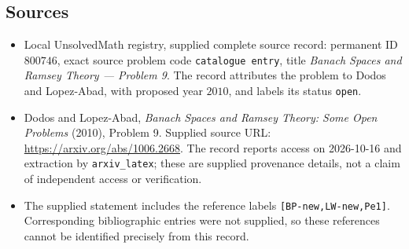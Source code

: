 \documentclass[11pt]{article}
\begin{document}
\subsection{Sources}
\begin{itemize}
\item Local UnsolvedMath registry, supplied complete source record: permanent ID \(800746\), exact source problem code \texttt{catalogue entry}, title \emph{Banach Spaces and Ramsey Theory --- Problem 9}. The record attributes the problem to Dodos and Lopez-Abad, with proposed year \(2010\), and labels its status \texttt{open}.
\item Dodos and Lopez-Abad, \emph{Banach Spaces and Ramsey Theory: Some Open Problems} (2010), Problem 9. Supplied source URL: \url{https://arxiv.org/abs/1006.2668}. The record reports access on 2026-10-16 and extraction by \texttt{arxiv\_latex}; these are supplied provenance details, not a claim of independent access or verification.
\item The supplied statement includes the reference labels \texttt{[BP-new,LW-new,Pe1]}. Corresponding bibliographic entries were not supplied, so these references cannot be identified precisely from this record.
\end{itemize}
\end{document}
